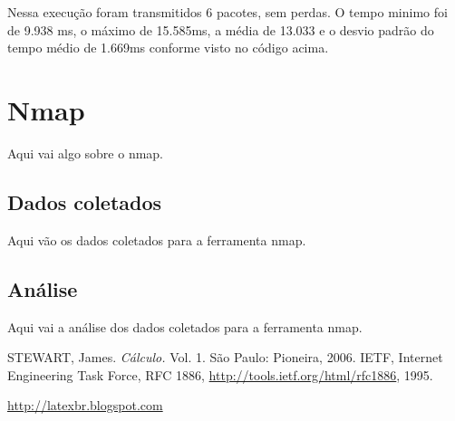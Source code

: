 \documentclass[a4paper]{report} %
\begin{document}
Nessa execução foram transmitidos 6 pacotes, sem perdas. O tempo minimo foi de 9.938 ms, o máximo de 15.585ms, a média de 13.033 e o desvio padrão do tempo médio de 1.669ms conforme visto no código acima.

\section{Nmap}
\label{sec_nmap}
Aqui vai algo sobre o nmap.
\subsection{Dados coletados}
\label{sub_nmap_dados}
Aqui vão os dados coletados para a ferramenta nmap.

\subsection{Análise}
\label{sub_nmap_analise}
Aqui vai a análise dos dados coletados para a ferramenta nmap.

\begin{thebibliography}{99}
 STEWART, James. {\sl C\'alculo.} Vol. 1. S\~ao Paulo: Pioneira, 2006.
 IETF, Internet Engineering Task Force, RFC 1886, \url{http://tools.ietf.org/html/rfc1886}, 1995.

\url{http://latexbr.blogspot.com}
\end{thebibliography}

\end{document}
